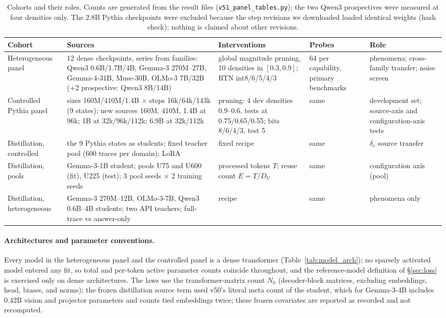 \begin{table}[H]
\centering\footnotesize\setlength{\tabcolsep}{3pt}
\begin{tabular}{@{}p{2.55cm}p{3.35cm}p{2.95cm}p{1.85cm}p{2.35cm}@{}}
\toprule
Cohort & Sources & Interventions & Probes & Role \\
\midrule
Heterogeneous panel & 12 dense checkpoints, \nSeries{} series from
\nFamilies{} families: Qwen3 0.6B/1.7B/4B, Gemma-3 270M--27B,
Gemma-4-31B, Muse-30B, OLMo-3 7B/32B (+2 prospective: Qwen3 8B/14B) &
global magnitude pruning, 10 densities in $[0.3,0.9]$; RTN int8/6/5/4/3
& 64 per capability, primary benchmarks & phenomena; cross-family
transfer; noise screen \\
Controlled Pythia panel & sizes 160M/410M/1.4B $\times$ steps
16k/64k/143k (9 states); new sources 160M, 410M, 1.4B at 96k; 1B at
32k/96k/112k; 6.9B at 32k/112k & pruning: 4 dev densities 0.9--0.6,
tests at 0.75/0.65/0.55; bits 8/6/4/3, test 5 & same & development
set; source-axis and configuration-axis tests \\
Distillation, controlled & the 9 Pythia states as students; fixed
teacher pool (600 traces per domain); LoRA & fixed recipe & same &
$\delta_c$ source transfer \\
Distillation, pools & Gemma-3-1B student; pools U75 and U600 (fit),
U225 (test); 3 pool seeds $\times$ 2 training seeds & processed tokens
$T$; reuse count $E=T/D_U$ & same & configuration axis (pool) \\
Distillation, heterogeneous & Gemma-3 270M--12B, OLMo-3-7B, Qwen3
0.6B--4B students; two API teachers; full-trace vs answer-only & recipe
& same & phenomena only \\
\bottomrule
\end{tabular}
\caption{Cohorts and their roles. Counts are generated from the result
files (\texttt{v51\_panel\_tables.py}); the two Qwen3 prospectives were
measured at four densities only. The 2.8B Pythia checkpoints were
excluded because the step revisions we downloaded loaded identical
weights (hash check); nothing is claimed about other revisions.}
\label{tab:panels_full}
\end{table}


\paragraph{Architectures and parameter conventions.} Every model in
the heterogeneous panel and the controlled panel is a dense
transformer (Table~\ref{tab:model_arch}); no sparsely activated model
entered any fit, so total and per-token active parameter counts
coincide throughout, and the reference-model definition of
\S\ref{sec:loss} is exercised only on dense architectures. The laws
use the transformer-matrix count $N_0$ (decoder-block matrices,
excluding embeddings, head, biases, and norms); the frozen
distillation source term used v50's literal meta count of the student,
which for Gemma-3-4B includes 0.42B vision and projector parameters
and counts tied embeddings twice; these frozen covariates are reported
as recorded and not recomputed.

